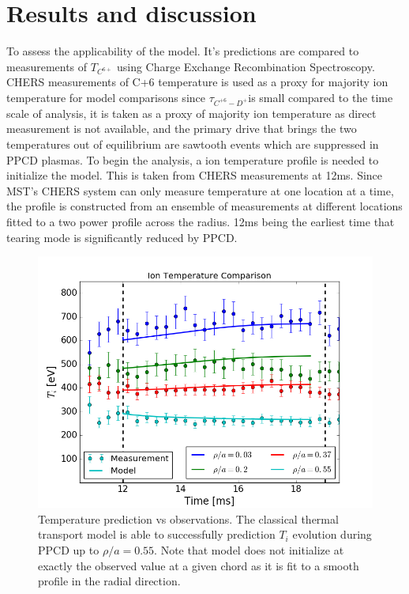\documentclass[aip, pop, preprint]{revtex4-1}
\begin{document}
\section{Results and discussion}

To assess the applicability of the model. It's predictions are compared to
measurements of $T_{C^{6+}}$ using Charge Exchange Recombination
Spectroscopy\cite{DenHartog1994ADynamics,DenHartog1994ADynamics}. CHERS
measurements of C+6 temperature is used as a proxy for majority ion temperature
for model comparisons since $\tau_{C^{+6}-D^{+}}$is small compared to the time
scale of analysis, it is taken as a proxy of majority ion temperature as direct
measurement is not available\cite{Reardon03}, and the primary drive that brings
the two temperatures out of equilibrium are sawtooth events which are
suppressed in PPCD plasmas\cite{Fiksel2009Mass-dependentPlasma}. To begin the
analysis, a ion temperature profile is needed to initialize the model. This is
taken from CHERS measurements at 12ms. Since MST's CHERS system can only
measure temperature at one location at a time, the profile is constructed from
an ensemble of measurements at different locations fitted to a two power
profile across the radius. 12ms being the earliest time that tearing mode is
significantly reduced by PPCD. 

\begin{figure}[!h]
	\centering
	\includegraphics[width=0.95\columnwidth]{./plots/temp_comp_ext}
	\caption{Temperature prediction vs observations. The classical thermal transport model is able to successfully prediction $T_i$ evolution during PPCD up to $\rho /a = 0.55$. Note that model does not initialize at exactly the observed value at a given chord as it is fit to a smooth profile in the radial direction.\label{fig:comp}}
\end{figure}
\end{document}
